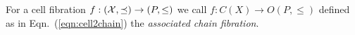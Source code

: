 %
%
%
% 
%
%
%
 
 For a cell fibration $f:({\mathcal X},\preceq)\to (P,\leq)$ we call $f:C(X)\to O(P,\leq)$ defined as in Eqn.~(\ref{eqn:cell2chain}) the {\em associated chain fibration}.





